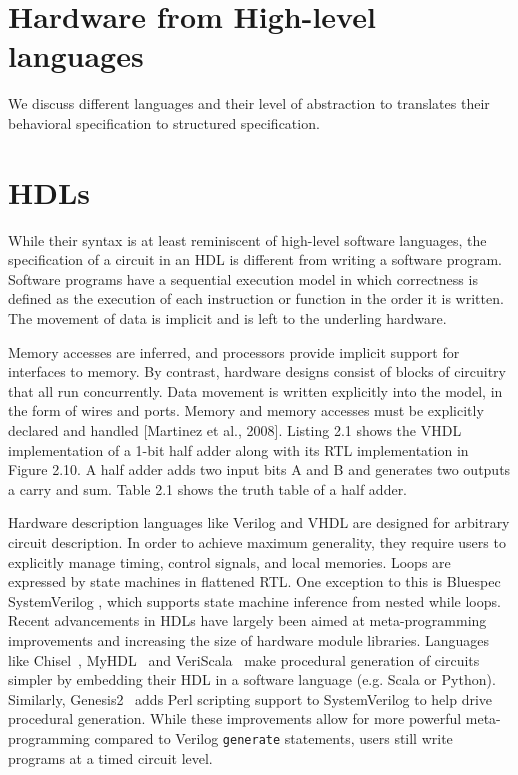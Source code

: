 

\section{Hardware from High-level languages}

We discuss different languages and their level of abstraction to translates their behavioral specification to structured specification.

\section{HDLs}
While their syntax is at least reminiscent of high-level software languages, the specification of a circuit in an HDL is different from writing a software program. Software programs have a sequential execution model in which correctness is defined as the execution of each instruction or function in the order it is written.
The movement of data is implicit and is left to the underling hardware.

Memory accesses are inferred, and processors provide implicit support for interfaces to memory. By contrast, hardware designs consist of blocks of circuitry that all run concurrently. Data movement is written explicitly into the model, in the form of wires and ports. Memory and memory accesses must be explicitly declared and handled [Martinez et al., 2008]. Listing 2.1 shows the VHDL implementation of a 1-bit half adder along with its RTL implementation in Figure 2.10. A half adder adds two input bits A and B and generates two outputs a carry and sum. Table 2.1 shows the truth table of a half adder.


Hardware description languages like Verilog and VHDL are designed for arbitrary circuit description. In order to achieve maximum generality, they require users to explicitly manage timing, control signals, and local memories. Loops are expressed by state machines in flattened RTL.
One exception to this is Bluespec SystemVerilog \cite{bluespec}, which supports state machine inference from nested while loops.
Recent advancements in HDLs have largely been aimed at meta-programming improvements and increasing the size of hardware module libraries.
Languages like Chisel~\cite{chisel}, MyHDL~\cite{myhdl} and VeriScala~\cite{veriscala} make procedural generation of circuits simpler by embedding their HDL in a software language (e.g. Scala or Python). Similarly, Genesis2~\cite{genesis2} adds Perl scripting support to SystemVerilog to help drive procedural generation. While these improvements allow for more powerful meta-programming compared to Verilog \texttt{\small{generate}} statements, users still write programs at a timed circuit level.




